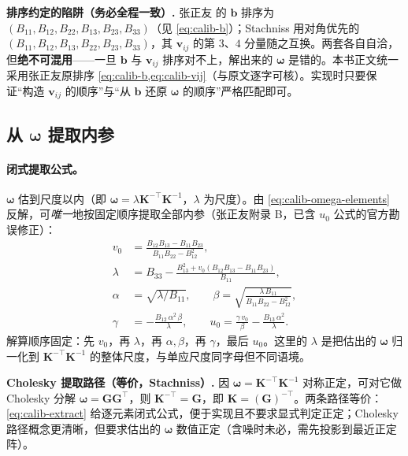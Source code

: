 \begin{note}
\textbf{排序约定的陷阱（务必全程一致）.}\;
张正友\cite{zhang2000calibration} 的 $\mathbf{b}$ 排序为 $(B_{11},B_{12},B_{22},B_{13},B_{23},B_{33})$（见 \cref{eq:calib-b}）；Stachniss\cite{stachniss2021zhang} 用对角优先的 $(B_{11},B_{12},B_{13},B_{22},B_{23},B_{33})$，其 $\mathbf{v}_{ij}$ 的第 $3$、$4$ 分量随之互换。两套各自自洽，但\textbf{绝不可混用}——一旦 $\mathbf{b}$ 与 $\mathbf{v}_{ij}$ 排序对不上，解出来的 $\boldsymbol{\omega}$ 是错的。本书正文统一采用张正友原排序 \cref{eq:calib-b,eq:calib-vij}（与原文逐字可核）。实现时只要保证“构造 $\mathbf{v}_{ij}$ 的顺序”与“从 $\mathbf{b}$ 还原 $\boldsymbol{\omega}$ 的顺序”严格匹配即可。
\end{note}

\subsection{从 \texorpdfstring{$\boldsymbol{\omega}$}{omega} 提取内参}
\label{sec:calib-extract-K}

\paragraph{闭式提取公式。}
$\boldsymbol{\omega}$ 估到尺度以内（即 $\boldsymbol{\omega}=\lambda\mathbf{K}^{-\top}\mathbf{K}^{-1}$，$\lambda$ 为尺度）。由 \cref{eq:calib-omega-elements} 反解，可\emph{唯一}地按固定顺序提取全部内参（张正友附录 B\cite{zhang2000calibration}，已含 $u_0$ 公式的官方勘误修正）：
\begin{equation}
  \begin{aligned}
  v_0 &= \frac{B_{12}B_{13}-B_{11}B_{23}}{B_{11}B_{22}-B_{12}^2},\\[1ex]
  \lambda &= B_{33}-\frac{B_{13}^2+v_0(B_{12}B_{13}-B_{11}B_{23})}{B_{11}},\\[1ex]
  \alpha &= \sqrt{\lambda/B_{11}},\qquad
  \beta = \sqrt{\frac{\lambda\,B_{11}}{B_{11}B_{22}-B_{12}^2}},\\[1ex]
  \gamma &= -\frac{B_{12}\,\alpha^2\,\beta}{\lambda},\qquad
  u_0 = \frac{\gamma\,v_0}{\beta}-\frac{B_{13}\,\alpha^2}{\lambda}.
  \end{aligned}
  \label{eq:calib-extract}
\end{equation}
解算顺序固定：先 $v_0$，再 $\lambda$，再 $\alpha,\beta$，再 $\gamma$，最后 $u_0$。这里的 $\lambda$ 是把估出的 $\boldsymbol{\omega}$ 归一化到 $\mathbf{K}^{-\top}\mathbf{K}^{-1}$ 的整体尺度，与单应尺度同字母但不同语境。

\begin{note}
\textbf{Cholesky 提取路径（等价，Stachniss\cite{stachniss2021zhang}）.}\;
因 $\boldsymbol{\omega}=\mathbf{K}^{-\top}\mathbf{K}^{-1}$ 对称正定，可对它做 Cholesky 分解 $\boldsymbol{\omega}=\mathbf{G}\mathbf{G}^\top$，则 $\mathbf{K}^{-\top}=\mathbf{G}$，即 $\mathbf{K}=(\mathbf{G})^{-\top}$。两条路径等价：\cref{eq:calib-extract} 给逐元素闭式公式，便于实现且不要求显式判定正定；Cholesky 路径概念更清晰，但要求估出的 $\boldsymbol{\omega}$ 数值正定（含噪时未必，需先投影到最近正定阵）。
\end{note}

